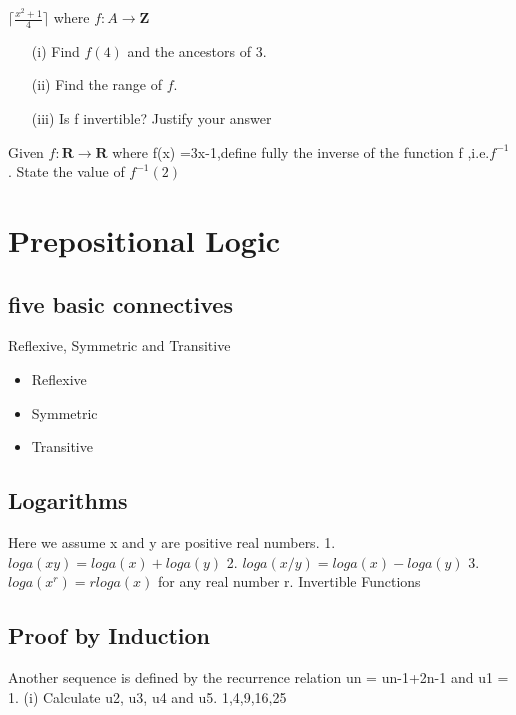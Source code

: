 \documentclass[]{report}
\begin{document}
\begin{enumerate}
$\lceil \frac{x^2+1}{4} \rceil$
where $f : A \rightarrow \textbf{Z}$
\begin{itemize}
\item[(i)] Find $f(4)$ and the ancestors of 3.
\item[(ii)] Find the range of $f$.
\item[(iii)] Is f invertible? Justify your answer
\end{itemize}

Given $f : \textbf{R} \rightarrow \textbf{R}$ where f(x) =3x-1,define fully
the inverse of the function f ,i.e.$f^{-1}$. 
State the value of $f^{-1}(2)$


\newpage

\section*{Prepositional Logic}

\subsection{five basic connectives}


Reflexive, Symmetric and Transitive

\begin{itemize} 
\item Reflexive
\item Symmetric
\item Transitive
\end{itemize}

\subsection{Logarithms}


Here we
assume x and y are positive real numbers.
1. $loga(xy) = loga(x) + loga(y)$
2. $loga(x/y)= loga(x) - loga(y)$
3. $loga (x^r) = r loga(x)$ for any real number r.
Invertible Functions

\subsection{Proof by Induction}

Another sequence is defined by the recurrence relation un = un-1+2n-1 and
u1 = 1.
(i) Calculate u2, u3, u4 and u5.
1,4,9,16,25


\end{enumerate}
\end{document}
